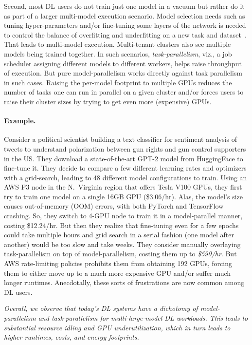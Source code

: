 \documentclass{article}
\begin{document}
Second, most DL users do not train just one model in a vacuum but rather do it as part of a larger multi-model execution scenario. Model selection needs such as tuning hyper-parameters and/or fine-tuning some layers of the network is needed to control the balance of overfitting and underfitting on a new task and dataset~\cite{understandingml}. That leads to multi-model execution. Multi-tenant clusters also see multiple models being trained together. In such scenarios, \textit{task-parallelism}, viz., a job scheduler assigning different models to different workers, helps raise throughput of execution. But pure model-parallelism works directly against task parallelism in such cases. Raising the per-model footprint to multiple GPUs reduces the number of tasks one can run in parallel on a given cluster and/or forces users to raise their cluster sizes by trying to get even more (expensive) GPUs.

\paragraph*{\textbf{Example.}} 
Consider a political scientist building a text classifier for sentiment analysis of tweets to understand polarization between gun rights and gun control supporters in the US. 
They download a state-of-the-art GPT-2 model from HuggingFace to fine-tune it. They decide to compare a few different learning rates and optimizers with a grid-search, leading to 48 different model configurations to train. Using an AWS P3 node in the N.~Virginia region that offers Tesla V100 GPUs, they first try to train one model on a single 16GB GPU (\$3.06/hr). Alas, the model's size causes out-of-memory (OOM) errors, with both PyTorch and TensorFlow crashing. So, they switch to 4-GPU node to train it in a model-parallel manner, costing \$12.24/hr. But then they realize that fine-tuning even for a few epochs could take multiple hours and grid search in a serial fashion (one model after another) would be too slow and take weeks. They consider manually overlaying task-parallelism on top of model-parallelism, costing them up to \textit{\$590/hr}. But AWS rate-limiting policies prohibits them from obtaining 192 GPUs, forcing them to either move up to a much more expensive GPU and/or suffer much longer runtimes. Anecdotally, these sorts of frustrations are now common among DL users. 

\textit{Overall, we observe that today's DL systems have a dichotomy of model-parallelism and task-parallelism for multi-large-model DL workloads. This leads to substantial resource idling and GPU underutilization, which in turn leads to higher runtimes, costs, and energy footprints.}
\end{document}
